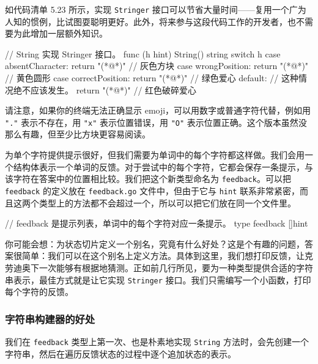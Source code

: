 如代码清单 5.23 所示，实现 \texttt{Stringer} 接口可以节省大量时间——复用一个广为人知的惯例，比试图耍聪明更好。此外，将来参与这段代码工作的开发者，也不需要为此增加一层额外知识。

\begin{gocode}[title={代码清单 5.23 \texttt{hint.go}：\texttt{String()} 方法}]
// String 实现 Stringer 接口。
func (h hint) String() string {
    switch h {
    case absentCharacter:
        return "(*@\PocketGraySquare@*)" // 灰色方块
    case wrongPosition:
        return "(*@\PocketYellowCircle@*)" // 黄色圆形
    case correctPosition:
        return "(*@\PocketGreenHeart@*)" // 绿色爱心
    default:
        // 这种情况绝不应该发生。
        return "(*@\PocketBrokenHeart@*)" // 红色破碎爱心
    }
}
\end{gocode}

请注意，如果你的终端无法正确显示 emoji，可以用数字或普通字符代替，例如用 \texttt{"."} 表示不存在，用 \texttt{"x"} 表示位置错误，用 \texttt{"O"} 表示位置正确。这个版本虽然没那么有趣，但至少比方块更容易阅读。

为单个字符提供提示很好，但我们需要为单词中的每个字符都这样做。我们会用一个结构体表示一个单词的反馈。对于尝试中的每个字符，它都会保存一条提示，与该字符在答案中的位置相比较。我们把这个新类型命名为 \texttt{feedback}。可以把 \texttt{feedback} 的定义放在 \texttt{feedback.go} 文件中，但由于它与 \texttt{hint} 联系非常紧密，而且这两个类型上的方法都不会超过一个，所以可以把它们放在同一个文件里。

\begin{gocode}[title={代码清单 5.24 \texttt{hint.go}：\texttt{feedback} 类型}]
// feedback 是提示列表，单词中的每个字符对应一条提示。
type feedback []hint
\end{gocode}

你可能会想：为状态切片定义一个别名，究竟有什么好处？这是个有趣的问题，答案很简单：我们可以在这个别名上定义方法。具体到这里，我们想打印反馈，让克劳迪奥下一次能够有根据地猜测。正如前几行所见，要为一种类型提供合适的字符串表示，最佳方式就是让它实现 \texttt{Stringer} 接口。我们只需编写一个小函数，打印每个字符的反馈。

\subsubsection*{字符串构建器的好处}

我们在 \texttt{feedback} 类型上第一次、也是朴素地实现 \texttt{String} 方法时，会先创建一个字符串，然后在遍历反馈状态的过程中逐个追加状态的表示。

